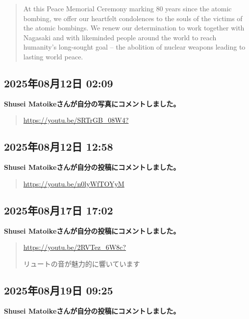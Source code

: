 \begin{quote}
At this Peace Memorial Ceremony marking 80 years since the atomic bombing, we offer our heartfelt condolences to the souls of the victims of the atomic bombings. We renew our determination to work together with Nagasaki and with likeminded people around the world to reach humanity's long-sought goal -- the abolition of nuclear weapons leading to lasting world peace.
\end{quote}

\subsection*{2025年08月12日 02:09}

\textbf{Shusei Matoikeさんが自分の写真にコメントしました。}

\begin{quote}
\url{https://youtu.be/SRTrGB_08W4?}
\end{quote}

\subsection*{2025年08月12日 12:58}

\textbf{Shusei Matoikeさんが自分の投稿にコメントしました。}

\begin{quote}
\url{https://youtu.be/n0lyWfTOYyM}
\end{quote}

\subsection*{2025年08月17日 17:02}

\textbf{Shusei Matoikeさんが自分の投稿にコメントしました。}

\begin{quote}
\url{https://youtu.be/2RVTez_6W8c?}

リュートの音が魅力的に響いています
\end{quote}

\subsection*{2025年08月19日 09:25}

\textbf{Shusei Matoikeさんが自分の投稿にコメントしました。}


